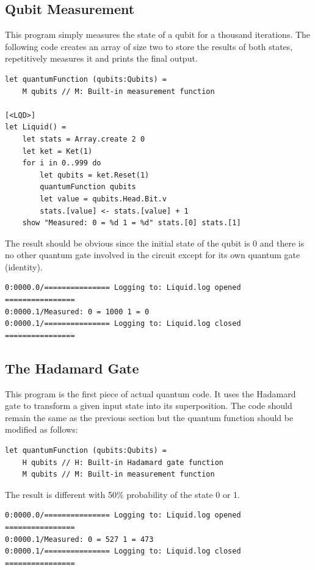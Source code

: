 \documentclass[12pt]{third-rep}
\begin{document}
\subsection{Qubit Measurement}
This program simply measures the state of a qubit for a thousand iterations. The following code creates an array of size two to store the results of both states, repetitively measures it and prints the final output.
\begin{verbatim}
let quantumFunction (qubits:Qubits) =
    M qubits // M: Built-in measurement function

[<LQD>]
let Liquid() =
    let stats = Array.create 2 0
    let ket = Ket(1)
    for i in 0..999 do
        let qubits = ket.Reset(1) 
        quantumFunction qubits
        let value = qubits.Head.Bit.v
        stats.[value] <- stats.[value] + 1
    show "Measured: 0 = %d 1 = %d" stats.[0] stats.[1]
\end{verbatim}
The result should be obvious since the initial state of the qubit is 0 and there is no other quantum gate involved in the circuit except for its own quantum gate (identity).
\begin{verbatim}
0:0000.0/=============== Logging to: Liquid.log opened ================
0:0000.1/Measured: 0 = 1000 1 = 0
0:0000.1/=============== Logging to: Liquid.log closed ================
\end{verbatim}

\subsection{The Hadamard Gate}
This program is the first piece of actual quantum code. It uses the Hadamard gate to transform a given input state into its superposition. The code should remain the same as the previous section but the quantum function should be modified as follows:
\begin{verbatim}
let quantumFunction (qubits:Qubits) =
    H qubits // H: Built-in Hadamard gate function
    M qubits // M: Built-in measurement function
\end{verbatim}
The result is different with 50\% probability of the state 0 or 1.
\begin{verbatim}
0:0000.0/=============== Logging to: Liquid.log opened ================
0:0000.1/Measured: 0 = 527 1 = 473
0:0000.1/=============== Logging to: Liquid.log closed ================
\end{verbatim}
\end{document}

